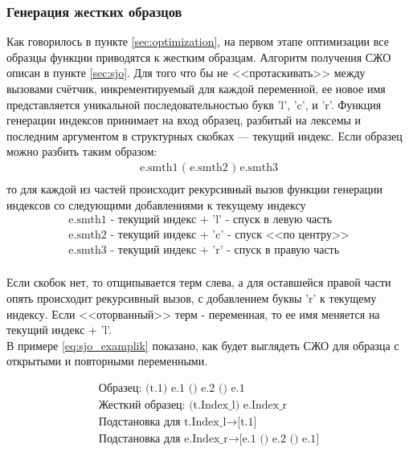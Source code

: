 \documentclass[12pt]{article}
\begin{document}
\subsubsection[Генерация жестких образцов]{\large Генерация жестких образцов}
\hspace{\parindent} Как говорилось в пункте \ref{sec:optimization}, на первом этапе оптимизации все образцы функции приводятся к жестким образцам. Алгоритм получения СЖО описан в пункте \ref{sec:sjo}. Для того что бы не <<протаскивать>> между вызовами счётчик, инкрементируемый для каждой переменной, ее новое имя представляется уникальной  последовательностью букв 'l', 'c', и 'r'. Функция генерации индексов принимает на вход образец, разбитый на лексемы и последним аргументом в структурных скобках --- текущий индекс. Если образец можно разбить таким образом:
\begin{equation*}
\begin{array}{l}
\textrm{e.smth1 ( e.smth2 ) e.smth3} \\
\end{array}
\end{equation*}
\indent то для каждой из частей происходит рекурсивный вызов функции генерации индексов со следующими добавлениями к текущему индексу
\begin{equation*}
\begin{array}{l}
\textrm{e.smth1 - текущий индекс + 'l' - спуск в левую часть} \\
\textrm{e.smth2 - текущий индекс + 'c' - спуск <<по центру>>} \\
\textrm{e.smth3 - текущий индекс + 'r' - спуск в правую часть} \\
\end{array}
\end{equation*}

\indent Если скобок нет, то отщипывается терм слева, а для оставшейся правой части опять происходит рекурсивный вызов, с добавлением буквы 'r' к текущему индексу. Если <<оторванный>> терм - переменная, то ее имя меняется на текущий индекс + 'l'. \\ \indent В примере \ref{eq:sjo_examplik} показано, как будет выглядеть СЖО для образца с открытыми и повторными переменными.

\begin{equation}\label{eq:sjo_examplik}
\begin{array}{l}
\textrm{Образец: (t.1) e.1 () e.2 () e.1} \\
\textrm{Жесткий образец: (t.Index\_l) e.Index\_r} \\
\textrm{Подстановка для t.Index\_l} \rightarrow \textrm{[t.1]} \\
\textrm{Подстановка для e.Index\_r} \rightarrow \textrm{[e.1 () e.2 () e.1]} \\
\end{array}
\end{equation}
\end{document}
